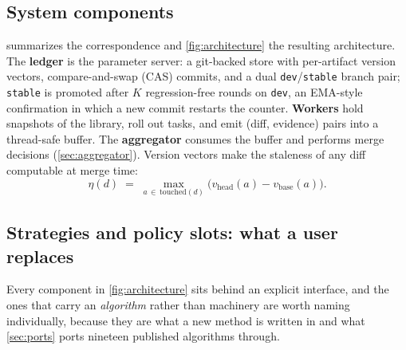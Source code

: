\documentclass{article}
\newcommand{\code}[1]{\texttt{#1}}
\begin{document}
\subsection{System components}
 summarizes the correspondence and \cref{fig:architecture} the resulting architecture. The \textbf{ledger} is the parameter server: a git-backed store with per-artifact version vectors, compare-and-swap (CAS) commits, and a dual \code{dev}/\code{stable} branch pair; \code{stable} is promoted after $K$ regression-free rounds on \code{dev}, an EMA-style confirmation in which a new commit restarts the counter. \textbf{Workers} hold snapshots of the library, roll out tasks, and emit (diff, evidence) pairs into a thread-safe buffer. The \textbf{aggregator} consumes the buffer and performs merge decisions (\cref{sec:aggregator}). Version vectors make the staleness of any diff computable at merge time:
\begin{equation}
\label{eq:eta}
\eta(d) \;=\; \max_{a \,\in\, \mathrm{touched}(d)} \bigl( v_{\mathrm{head}}(a) - v_{\mathrm{base}}(a) \bigr).
\end{equation}

\subsection{Strategies and policy slots: what a user replaces}
\label{sec:pluggable}

Every component in \cref{fig:architecture} sits behind an explicit interface, and the ones that carry an \emph{algorithm} rather than machinery are worth naming individually, because they are what a new method is written in and what \cref{sec:ports} ports nineteen published algorithms through.
\end{document}
